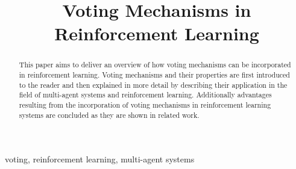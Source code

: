 \documentclass[conference]{IEEEtran}
\begin{document}
\title{Voting Mechanisms in Reinforcement Learning}

\author{
}

\maketitle


\begin{abstract}
This paper aims to deliver an overview of how voting mechanisms can be incorporated in reinforcement learning.
Voting mechanisms and their properties are first introduced to the reader and then explained in more detail by describing their application in the field of multi-agent systems and reinforcement learning.
Additionally advantages resulting from the incorporation of voting mechanisms in reinforcement learning systems are concluded as they are shown in related work.
\end{abstract}

\begin{IEEEkeywords}
voting, reinforcement learning, multi-agent systems
\end{IEEEkeywords}

\end{document}
